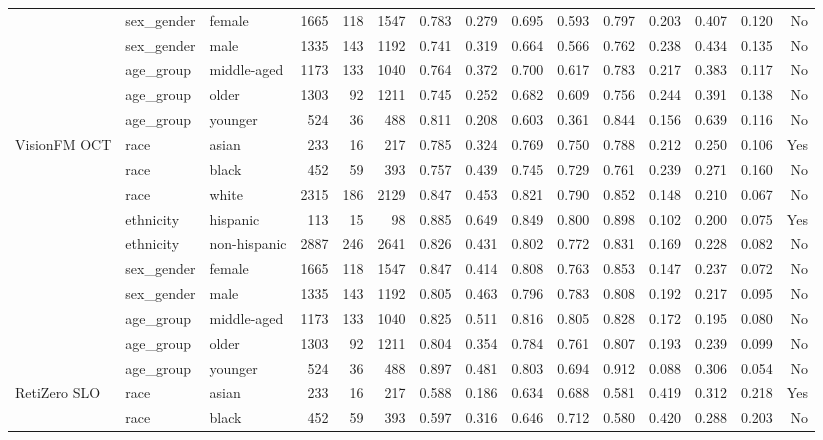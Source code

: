 \begin{longtable}{@{}lllrrrrrrrrrrrr@{}}
 & sex\_gender & female & 1665 & 118 & 1547 & 0.783 & 0.279 & 0.695 & 0.593 & 0.797 & 0.203 & 0.407 & 0.120 & No \\
 & sex\_gender & male & 1335 & 143 & 1192 & 0.741 & 0.319 & 0.664 & 0.566 & 0.762 & 0.238 & 0.434 & 0.135 & No \\
 & age\_group & middle-aged & 1173 & 133 & 1040 & 0.764 & 0.372 & 0.700 & 0.617 & 0.783 & 0.217 & 0.383 & 0.117 & No \\
 & age\_group & older & 1303 & 92 & 1211 & 0.745 & 0.252 & 0.682 & 0.609 & 0.756 & 0.244 & 0.391 & 0.138 & No \\
 & age\_group & younger & 524 & 36 & 488 & 0.811 & 0.208 & 0.603 & 0.361 & 0.844 & 0.156 & 0.639 & 0.116 & No \\
VisionFM OCT & race & asian & 233 & 16 & 217 & 0.785 & 0.324 & 0.769 & 0.750 & 0.788 & 0.212 & 0.250 & 0.106 & Yes \\
 & race & black & 452 & 59 & 393 & 0.757 & 0.439 & 0.745 & 0.729 & 0.761 & 0.239 & 0.271 & 0.160 & No \\
 & race & white & 2315 & 186 & 2129 & 0.847 & 0.453 & 0.821 & 0.790 & 0.852 & 0.148 & 0.210 & 0.067 & No \\
 & ethnicity & hispanic & 113 & 15 & 98 & 0.885 & 0.649 & 0.849 & 0.800 & 0.898 & 0.102 & 0.200 & 0.075 & Yes \\
 & ethnicity & non-hispanic & 2887 & 246 & 2641 & 0.826 & 0.431 & 0.802 & 0.772 & 0.831 & 0.169 & 0.228 & 0.082 & No \\
 & sex\_gender & female & 1665 & 118 & 1547 & 0.847 & 0.414 & 0.808 & 0.763 & 0.853 & 0.147 & 0.237 & 0.072 & No \\
 & sex\_gender & male & 1335 & 143 & 1192 & 0.805 & 0.463 & 0.796 & 0.783 & 0.808 & 0.192 & 0.217 & 0.095 & No \\
 & age\_group & middle-aged & 1173 & 133 & 1040 & 0.825 & 0.511 & 0.816 & 0.805 & 0.828 & 0.172 & 0.195 & 0.080 & No \\
 & age\_group & older & 1303 & 92 & 1211 & 0.804 & 0.354 & 0.784 & 0.761 & 0.807 & 0.193 & 0.239 & 0.099 & No \\
 & age\_group & younger & 524 & 36 & 488 & 0.897 & 0.481 & 0.803 & 0.694 & 0.912 & 0.088 & 0.306 & 0.054 & No \\
RetiZero SLO & race & asian & 233 & 16 & 217 & 0.588 & 0.186 & 0.634 & 0.688 & 0.581 & 0.419 & 0.312 & 0.218 & Yes \\
 & race & black & 452 & 59 & 393 & 0.597 & 0.316 & 0.646 & 0.712 & 0.580 & 0.420 & 0.288 & 0.203 & No \\

\end{longtable}
